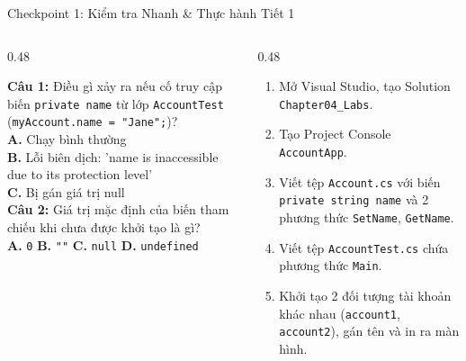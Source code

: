 \documentclass[aspectratio=169, 10pt]{beamer}
\begin{document}
\begin{frame}{Checkpoint 1: Kiểm tra Nhanh \& Thực hành Tiết 1}
  \begin{columns}[T]
    \begin{column}{0.48\textwidth}
      \begin{tcolorbox}[colback=UniOrange!10,colframe=UniOrange,title=\textbf{Quiz Checkpoint 1},fonttitle=\small\bfseries]
        \small \textbf{Câu 1:} Điều gì xảy ra nếu cố truy cập biến \texttt{private name} từ lớp \texttt{AccountTest} (\texttt{myAccount.name = "Jane";})?\\
        \textbf{A.} Chạy bình thường\\
        \textbf{B.} Lỗi biên dịch: 'name is inaccessible due to its protection level' \checkmark\\
        \textbf{C.} Bị gán giá trị null\\
        \vspace{2mm}
        \textbf{Câu 2:} Giá trị mặc định của biến tham chiếu khi chưa được khởi tạo là gì?\\
        \textbf{A.} \texttt{0} \quad \textbf{B.} \texttt{""} \quad \textbf{C.} \texttt{null} \checkmark \quad \textbf{D.} \texttt{undefined}
      \end{tcolorbox}
    \end{column}

    \begin{column}{0.48\textwidth}
      \begin{tcolorbox}[colback=UniGreen!10,colframe=UniGreen,title=\textbf{Hands-on Lab 1 (15 Phút)},fonttitle=\small\bfseries]
        \begin{enumerate}\small
          \item Mở Visual Studio, tạo Solution \texttt{Chapter04\_Labs}.
          \item Tạo Project Console \texttt{AccountApp}.
          \item Viết tệp \texttt{Account.cs} với biến \texttt{private string name} và 2 phương thức \texttt{SetName}, \texttt{GetName}.
          \item Viết tệp \texttt{AccountTest.cs} chứa phương thức \texttt{Main}.
          \item Khởi tạo 2 đối tượng tài khoản khác nhau (\texttt{account1}, \texttt{account2}), gán tên và in ra màn hình.
        \end{enumerate}
      \end{tcolorbox}
    \end{column}
  \end{columns}
\end{frame}
\end{document}
